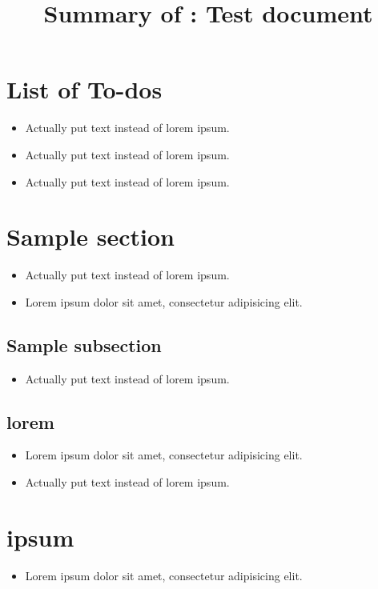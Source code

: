 \section{List of To-dos}
    \begin{itemize}[noitemsep]
        \item {\color{red}Actually put text instead of lorem ipsum.}  %
        \item {\color{red}Actually put text instead of lorem ipsum.}  %
        \item {\color{red}Actually put text instead of lorem ipsum.}  %
    \end{itemize}

\title{Summary of : Test document}  %

\maketitle  %

\section{Sample section}  %
    \begin{itemize}[noitemsep]
        \item {\color{red}Actually put text instead of lorem ipsum.}  %
        \item Lorem ipsum dolor sit amet, consectetur adipisicing elit.  %
    \end{itemize}
\subsection{Sample subsection}  %
    \begin{itemize}[noitemsep]
        \item {\color{red}Actually put text instead of lorem ipsum.}  %
    \end{itemize}
\subsection{lorem}  %
    \begin{itemize}[noitemsep]
        \item Lorem ipsum dolor sit amet, consectetur adipisicing elit.  %
        \item {\color{red}Actually put text instead of lorem ipsum.}  %
    \end{itemize}
\section{ipsum}  %
    \begin{itemize}[noitemsep]
        \item Lorem ipsum dolor sit amet, consectetur adipisicing elit.  %
    \end{itemize}

